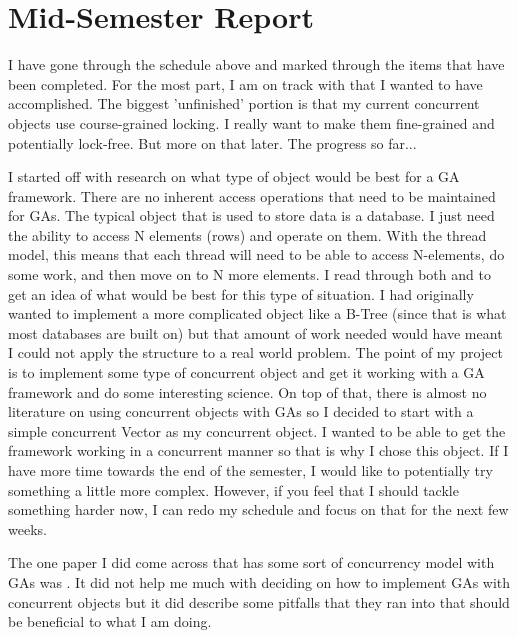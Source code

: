 \documentclass{acm_proc_article-sp}
\begin{document}
\section{Mid-Semester Report}

I have gone through the schedule above and marked through the items that have been completed. For the most part, I am on track with that I wanted to have accomplished. The biggest 'unfinished' portion is that my current concurrent objects use course-grained locking. I really want to make them fine-grained and potentially lock-free. But more on that later. The progress so far...

I started off with research on what type of object would be best for a GA framework. There are no inherent access operations that need to be maintained for GAs. The typical object that is used to store data is a database. I just need the ability to access N elements (rows) and operate on them. With the thread model, this means that each thread will need to be able to access N-elements, do some work, and then move on to N more elements. I read through both \cite{herlihy:artmulti} and \cite{williams:cppconcurrent} to get an idea of what would be best for this type of situation. I had originally wanted to implement a more complicated object like a B-Tree (since that is what most databases are built on) but that amount of work needed would have meant I could not apply the structure to a real world problem. The point of my project is to implement some type of concurrent object and get it working with a GA framework and do some interesting science. On top of that, there is almost no literature on using concurrent objects with GAs so I decided to start with a simple concurrent Vector as my concurrent object. I wanted to be able to get the framework working in a concurrent manner so that is why I chose this object. If I have more time towards the end of the semester, I would like to potentially try something a little more complex. However, if you feel that I should tackle something harder now, I can redo my schedule and focus on that for the next few weeks.


The one paper I did come across that has some sort of concurrency model with GAs was \cite{Koppen:paper1}. It did not help me much with deciding on how to implement GAs with concurrent objects but it did describe some pitfalls that they ran into that should be beneficial to what I am doing. 
\end{document}
